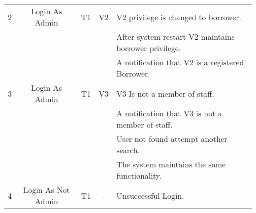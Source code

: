 \documentclass[a4paper,12pt]{article}
\begin{document}
\begin{table}[ht]
\begin{tabular}{| c | c | c | c | p{3.7in} |}
2 & Login As Admin & T1 & V2 & V2 privilege is changed to borrower. \\
  &                &    &    & After system restart V2 maintains borrower privilege. \\
  &                &    &    & A notification that V2 is a registered Borrower. \\
3 & Login As Admin & T1 & V3 & V3 Is not a member of staff. \\
  &                &    &    & A notification that V3 is not a member of staff. \\ 
  &                &    &    & User not found attempt another search. \\
  &                &    &    & The system maintains the same functionality. \\
4 & Login As Not Admin & T1 & -  & Unsuccessful Login. \\ \hline
\end{tabular}
\label{table:nonlin}
\end{table}
\end{document}
